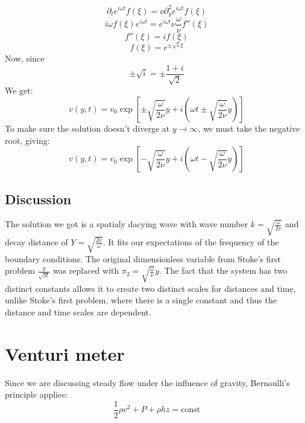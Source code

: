 \documentclass{article}
\begin{document}
\begin{equation}
    \partial_t e^{i \omega t} f(\xi) = \nu \partial_y^2 e^{i \omega t} f(\xi)
\end{equation}
\begin{equation}
    i\omega f(\xi)e^{i \omega t} = e^{i \omega t} \nu \frac{\omega}{\nu} f''(\xi)
\end{equation}
\begin{equation}
    f''(\xi) = if(\xi)
\end{equation}
\begin{equation}
    f(\xi) = e^{\pm\sqrt{i}\xi}
\end{equation}
Now, since
\begin{equation}
    \pm \sqrt{i} = \pm\frac{1 + i}{\sqrt{2}}
\end{equation}
We get:
\begin{equation}
    v(y, t) = v_0 \exp[\pm \sqrt{\frac{\omega}{2\nu}}y +i\left(
        \omega t \pm \sqrt{\frac{\omega}{2\nu}}y
    \right)]
\end{equation}
To make sure the solution doesn't diverge at $y \rightarrow \infty$, we must take the negative root, giving:
\begin{equation}
    v(y, t) = v_0 \exp[-\sqrt{\frac{\omega}{2\nu}}y +i\left(
        \omega t - \sqrt{\frac{\omega}{2\nu}}y
    \right)]
\end{equation}
\subsection{Discussion}
The solution we got is a spatialy dacying wave with wave number $k = \sqrt{\frac{\omega}{2\nu}}$ and decay distance of $Y = \sqrt{\frac{2\nu}{\omega}}$. It fits our expectations of the frequency of the boundary conditions.
\newline
The original dimensionless variable from Stoke's first problem $\frac{y}{\sqrt{\nu t}}$ was replaced with $\pi_2 = \sqrt{\frac{\omega}{\nu}}y$. The fact that the system has two distinct constants allows it to create two distinct scales for distances and time, unlike Stoke's first problem, where there is a single constant and thus the distance and time scales are dependent. 

\newpage
\section{Venturi meter}
Since we are discussing steady flow under the influence of gravity, Bernoulli’s principle applies:
\begin{equation}
    \frac{1}{2}\rho v^2 + P + \rho h z = \text{const}
\end{equation}
\end{document}
